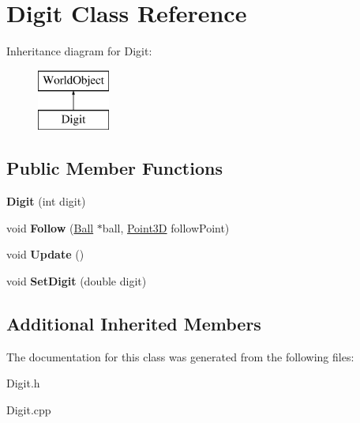 \hypertarget{class_digit}{\section{Digit Class Reference}
\label{class_digit}
}
Inheritance diagram for Digit\+:\begin{figure}[H]
\begin{center}
\leavevmode
\includegraphics[height=2.000000cm]{class_digit}
\end{center}
\end{figure}
\subsection*{Public Member Functions}
\begin{DoxyCompactItemize}
\item 
\hypertarget{class_digit_ac26a02f08c1ea432947616ffd27e9858}{{\bfseries Digit} (int digit)}\label{class_digit_ac26a02f08c1ea432947616ffd27e9858}

\item 
\hypertarget{class_digit_ae67a2c0b0a951a31b8a618911b87f0bc}{void {\bfseries Follow} (\hyperlink{class_ball}{Ball} $\ast$ball, \hyperlink{struct_point3_d}{Point3\+D} follow\+Point)}\label{class_digit_ae67a2c0b0a951a31b8a618911b87f0bc}

\item 
\hypertarget{class_digit_a00d932e15f940d2e1e1da94bdeaa498a}{void {\bfseries Update} ()}\label{class_digit_a00d932e15f940d2e1e1da94bdeaa498a}

\item 
\hypertarget{class_digit_a528791513a2feaa3e96b12475f86843f}{void {\bfseries Set\+Digit} (double digit)}\label{class_digit_a528791513a2feaa3e96b12475f86843f}

\end{DoxyCompactItemize}
\subsection*{Additional Inherited Members}


The documentation for this class was generated from the following files\+:\begin{DoxyCompactItemize}
\item 
Digit.\+h\item 
Digit.\+cpp\end{DoxyCompactItemize}
